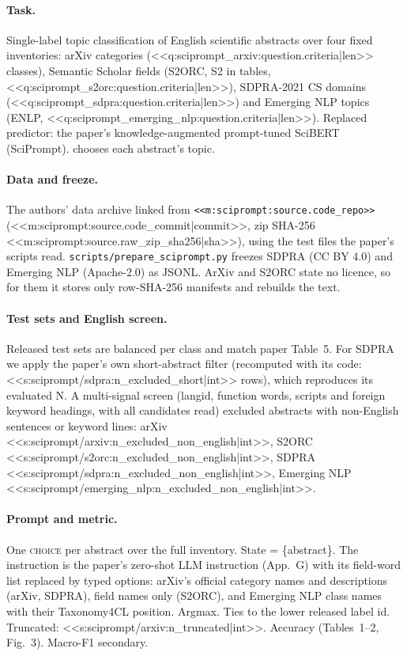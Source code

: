 \paragraph{Task.} Single-label topic classification of English scientific abstracts over four fixed inventories:
arXiv categories (<<q:sciprompt_arxiv:question.criteria|len>> classes), Semantic Scholar fields (S2ORC, S2 in tables,
<<q:sciprompt_s2orc:question.criteria|len>>), SDPRA-2021 CS domains (<<q:sciprompt_sdpra:question.criteria|len>>)
and Emerging NLP topics (ENLP, <<q:sciprompt_emerging_nlp:question.criteria|len>>). Replaced predictor: the paper's
knowledge-augmented prompt-tuned SciBERT (SciPrompt). \jev{} chooses each abstract's topic.

\paragraph{Data and freeze.} The authors' data archive linked from \texttt{<<m:sciprompt:source.code_repo>>}
(<<m:sciprompt:source.code_commit|commit>>, zip SHA-256 <<m:sciprompt:source.raw_zip_sha256|sha>>), using the test
files the paper's scripts read. \texttt{scripts/prepare\_sciprompt.py} freezes SDPRA (CC BY 4.0) and Emerging NLP
(Apache-2.0) as JSONL. ArXiv and S2ORC state no licence, so for them it stores only row-SHA-256 manifests and
rebuilds the text.

\paragraph{Test sets and English screen.} Released test sets are balanced per class and match paper Table~5. For
SDPRA we apply the paper's own short-abstract filter (recomputed with its code:
<<s:sciprompt/sdpra:n_excluded_short|int>> rows), which reproduces its evaluated N. A multi-signal screen (langid,
function words, scripts and foreign keyword headings, with all candidates read) excluded abstracts with non-English
sentences or keyword lines: arXiv <<s:sciprompt/arxiv:n_excluded_non_english|int>>, S2ORC
<<s:sciprompt/s2orc:n_excluded_non_english|int>>, SDPRA <<s:sciprompt/sdpra:n_excluded_non_english|int>>, Emerging NLP
<<s:sciprompt/emerging_nlp:n_excluded_non_english|int>>.

\paragraph{Prompt and metric.} One \textsc{choice} per abstract over the full inventory. State = \{abstract\}. The
instruction is the paper's zero-shot LLM instruction (App.~G) with its field-word list replaced by typed options:
arXiv's official category names and descriptions (arXiv, SDPRA), field names only (S2ORC), and Emerging NLP class
names with their Taxonomy4CL position. Argmax. Ties to the lower released label id. Truncated:
<<s:sciprompt/arxiv:n_truncated|int>>. Accuracy (Tables~1--2, Fig.~3). Macro-F1 secondary.

